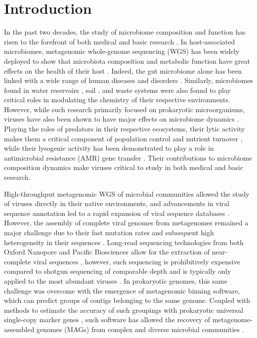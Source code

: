 \section*{Introduction}
In the past two decades, the study of microbiome composition and function has risen to the forefront of both medical and basic research \cite{RN2905, RN2908}. In host-associated microbiomes, metagenomic whole-genome sequencing (WGS) has been widely deployed to show that microbiota composition and metabolic function have great effects on the health of their host \cite{RN2905, RN2929, RN2907}. Indeed, the gut microbiome alone has been linked with a wide range of human diseases and disorders \cite{RN2938, RN2937}. Similarly, microbiomes found in water reservoirs \cite{RN2939}, soil \cite{RN2941}, and waste systems \cite{RN2942} were also found to play critical roles in modulating the chemistry of their respective environments. However, while such research primarily focused on prokaryotic microorganisms, viruses have also been shown to have major effects on microbiome dynamics \cite{RN2945, RN2943}. Playing the roles of predators in their respective ecosystems, their lytic activity makes them a critical component of population control and nutrient turnover \cite{RN2960}, while their lysogenic activity has been demonstrated to play a role in antimicrobial resistance (AMR) gene transfer \cite{RN2977}. Their contributions to microbiome composition dynamics make viruses critical to study in both medical and basic research.

High-throughput metagenomic WGS of microbial communities allowed the study of viruses directly in their native environments, and advancements in viral sequence annotation led to a rapid expansion of viral sequence databases \cite{RN2944, RN2963}. However, the assembly of complete viral genomes from metagenomes remained a major challenge due to their fast mutation rates and subsequent high heterogeneity in their sequences \cite{RN2964, RN2965}. Long-read sequencing technologies from both Oxford Nanopore and Pacific Biosciences allow for the extraction of near-complete viral sequences \cite{RN2966, RN2967}, however, such sequencing is prohibitively expensive compared to shotgun sequencing of comparable depth and is typically only applied to the most abundant viruses \cite{RN2968}. In prokaryotic genomes, this same challenge was overcome with the emergence of metagenomic binning software, which can predict groups of contigs belonging to the same genome. Coupled with methods to estimate the accuracy of such groupings with prokaryotic universal single-copy marker genes \cite{RN13}, such software has allowed the recovery of metagenome-assembled genomes (MAGs) from complex and diverse microbial communities \cite{RN73, RN2971, RN2970}. 

